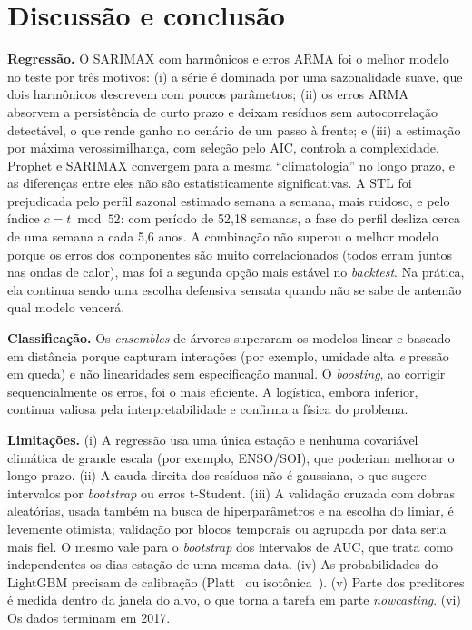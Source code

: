\documentclass[conference,a4paper]{IEEEtran}
\begin{document}
\section{Discussão e conclusão}\label{sec:disc}

\textbf{Regressão.} O SARIMAX com harmônicos e erros ARMA foi o melhor modelo no teste por
três motivos: (i) a série é dominada por uma sazonalidade suave, que dois harmônicos descrevem
com poucos parâmetros; (ii) os erros ARMA absorvem a persistência de curto prazo e deixam
resíduos sem autocorrelação detectável, o que rende ganho no cenário de um passo à frente; e (iii) a estimação por
máxima verossimilhança, com seleção pelo AIC, controla a complexidade. Prophet e SARIMAX
convergem para a mesma ``climatologia'' no longo prazo, e as diferenças entre eles não são
estatisticamente significativas. A STL foi prejudicada pelo perfil sazonal estimado semana a
semana, mais ruidoso, e pelo índice $c = t \bmod 52$: com período de 52,18 semanas, a fase
do perfil desliza cerca de uma semana a cada 5,6 anos. A combinação não superou o melhor modelo porque os erros dos componentes
são muito correlacionados (todos erram juntos nas ondas de calor), mas foi a segunda opção mais
estável no \textit{backtest}. Na prática, ela continua sendo uma escolha defensiva sensata
quando não se sabe de antemão qual modelo vencerá.

\textbf{Classificação.} Os \textit{ensembles} de árvores superaram os modelos linear e baseado
em distância porque capturam interações (por exemplo, umidade alta \emph{e} pressão em queda) e
não linearidades sem especificação manual. O \textit{boosting}, ao corrigir sequencialmente os
erros, foi o mais eficiente. A logística, embora inferior, continua valiosa pela
interpretabilidade e confirma a física do problema.

\textbf{Limitações.} (i) A regressão usa uma única estação e nenhuma covariável climática de
grande escala (por exemplo, ENSO/SOI), que poderiam melhorar o longo prazo. (ii) A cauda
direita dos resíduos não é gaussiana, o que sugere intervalos por \textit{bootstrap} ou erros
t-Student. (iii) A validação cruzada com dobras aleatórias, usada também na busca de hiperparâmetros
e na escolha do limiar, é levemente otimista; validação por blocos temporais ou agrupada por
data seria mais fiel. O mesmo vale para o \textit{bootstrap} dos intervalos de AUC, que trata
como independentes os dias-estação de uma mesma data. (iv) As probabilidades do LightGBM
precisam de calibração (Platt~\cite{platt1999probabilistic} ou
isotônica~\cite{zadrozny2002transforming}). (v) Parte dos preditores é medida dentro da janela
do alvo, o que torna a tarefa em parte \textit{nowcasting}. (vi) Os dados terminam em 2017.
\end{document}
